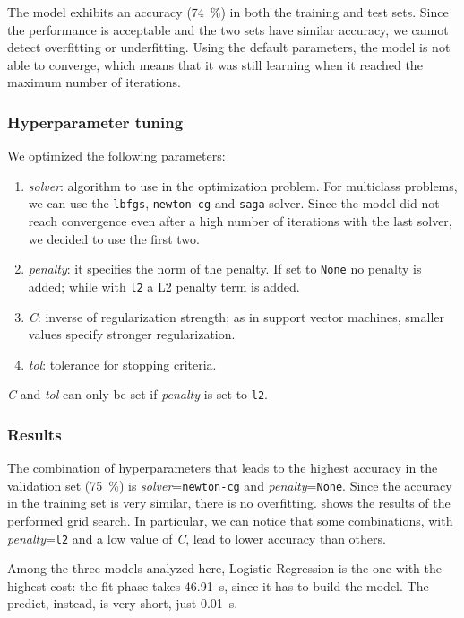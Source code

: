\documentclass[acmlarge,nonacm]{acmart}
\begin{document}
The model exhibits an accuracy (\SI{74}{\percent}) in both the training and test sets. Since the performance is acceptable and the two sets have similar accuracy, we cannot detect overfitting or underfitting. Using the default parameters, the model is not able to converge, which means that it was still learning when it reached the maximum number of iterations.

\subsubsection{Hyperparameter tuning} 
We optimized the following parameters:
\begin{enumerate}
    \item \emph{solver}: algorithm to use in the optimization problem. For multiclass problems, we can use the \verb|lbfgs|, \verb|newton-cg| and \verb|saga| solver. Since the model did not reach convergence even after a high number of iterations with the last solver, we decided to use the first two.
    \item \emph{penalty}: it specifies the norm of the penalty. If set to \verb|None| no penalty is added; while with \verb|l2| a L2 penalty term is added.
    \item \emph{C}: inverse of regularization strength; as in support vector machines, smaller values specify stronger regularization.
    \item \emph{tol}: tolerance for stopping criteria.
\end{enumerate}
\emph{C} and \emph{tol} can only be set if \emph{penalty} is set to \verb|l2|.

\subsubsection{Results}
The combination of hyperparameters that leads to the highest accuracy in the validation set (\SI{75}{\percent}) is \emph{solver}=\verb|newton-cg| and \emph{penalty}=\verb|None|. Since the accuracy in the training set is very similar, there is no overfitting.  shows the results of the performed grid search. In particular, we can notice that some combinations, with \emph{penalty}=\verb|l2| and a low value of \emph{C}, lead to lower accuracy than others.

Among the three models analyzed here, Logistic Regression is the one with the highest cost: the fit phase takes \SI{46.91}{\second}, since it has to build the model. The predict, instead, is very short, just \SI{0.01}{\second}.
\end{document}
